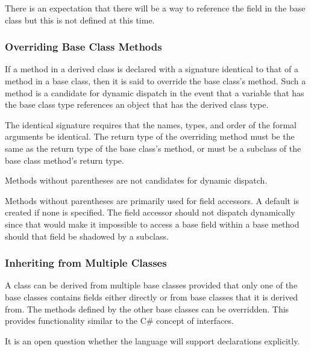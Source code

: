 \begin{openissue}
There is an expectation that there will
be a way to reference the field in the base class but this is not
defined at this time.
\end{openissue}

\subsubsection{Overriding Base Class Methods}
\label{Overriding_Base_Class_Methods}

If a method in a derived class is declared with a
signature identical to that of a method in a base class, then it is said to override the
base class's method.  Such a method is a candidate for dynamic
dispatch in the event that a variable that has the base class type
references an object that has the derived class type.

The identical signature requires that the names, types, and order of
the formal arguments be identical. The return type of the overriding
method must be the same as the return type of the base class's method,
or must be a subclass of the base class method's return type.

Methods without parentheses are not candidates for dynamic dispatch.
\begin{rationale}
Methods without parentheses are primarily used for field accessors.  
A default is created if none is specified.  The field accessor
should not dispatch dynamically since that would make it
impossible to access a base field within a base method should that
field be shadowed by a subclass.
\end{rationale}

\subsubsection{Inheriting from Multiple Classes}
\label{Inheriting_from_Multiple_Classes}

A class can be derived from multiple base classes provided that only
one of the base classes contains fields either directly or from base
classes that it is derived from.  The methods defined by the other
base classes can be overridden.  This provides functionality similar to the C\#
concept of interfaces.

\begin{openissue}
It is an open question whether the language will support 
declarations explicitly.
\end{openissue}

